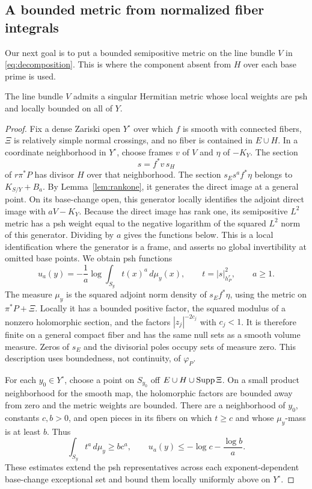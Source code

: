 \subsection{A bounded metric from normalized fiber integrals}\label{subsec:metric}

Our next goal is to put a bounded semipositive metric on the line bundle $V$ in \eqref{eq:decomposition}. This is where the component absent from $H$ over each base prime is used.

\begin{proposition}\label{prop:boundedbase}
The line bundle $V$ admits a singular Hermitian metric whose local weights are psh and locally bounded on all of $Y$.
\end{proposition}

\begin{proof}
Fix a dense Zariski open $Y^\circ$ over which $f$ is smooth with connected fibers, $\Xi$ is relatively simple normal crossings, and no fiber is contained in $E\cup H$. In a coordinate neighborhood in $Y^\circ$, choose frames $v$ of $V$ and $\eta$ of $-K_Y$. The section
\[
s=f^*v\,s_H
\]
of $r\pi^*P$ has divisor $H$ over that neighborhood. The section $s_Es^af^*\eta$ belongs to $K_{S/Y}+B_a$. By Lemma~\ref{lem:rankone}, it generates the direct image at a general point. On its base-change open, this generator locally identifies the adjoint direct image with $aV-K_Y$. Because the direct image has rank one, its semipositive $L^2$ metric has a psh weight equal to the negative logarithm of the squared $L^2$ norm of this generator. Dividing by $a$ gives the functions below. This is a local identification where the generator is a frame, and asserts no global invertibility at omitted base points. We obtain psh functions
\begin{equation}\label{eq:ua}
u_a(y)=-\frac1a\log\int_{S_y}t(x)^a\,d\mu_y(x),
\qquad t=|s|_{h_P^r}^2,\qquad a\ge1.
\end{equation}
The measure $\mu_y$ is the squared adjoint norm density of $s_Ef^*\eta$, using the metric on $\pi^*P+\Xi$. Locally it has a bounded positive factor, the squared modulus of a nonzero holomorphic section, and the factors $|z_j|^{-2c_j}$ with $c_j<1$. It is therefore finite on a general compact fiber and has the same null sets as a smooth volume measure. Zeros of $s_E$ and the divisorial poles occupy sets of measure zero. This description uses boundedness, not continuity, of $\varphi_P$.

For each $y_0\in Y^\circ$, choose a point on $S_{y_0}$ off $E\cup H\cup\operatorname{Supp}\Xi$. On a small product neighborhood for the smooth map, the holomorphic factors are bounded away from zero and the metric weights are bounded. There are a neighborhood of $y_0$, constants $c,b>0$, and open pieces in its fibers on which $t\ge c$ and whose $\mu_y$-mass is at least $b$. Thus
\[
\int_{S_y}t^a\,d\mu_y\ge b c^a,
\qquad
u_a(y)\le-\log c-\frac{\log b}{a}.
\]
These estimates extend the psh representatives across each exponent-dependent base-change exceptional set and bound them locally uniformly above on $Y^\circ$.


\end{proof}
